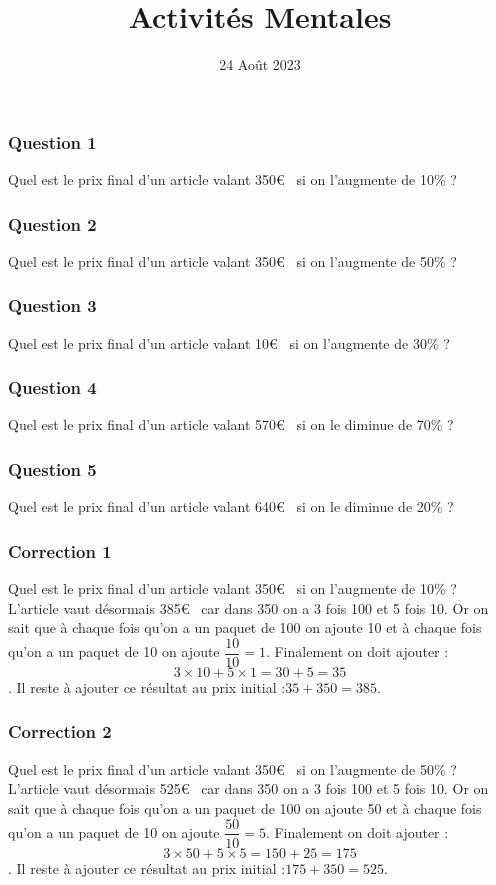 \documentclass[15pt, mathserif]{beamer}
\title{Activités Mentales}
\date{24 Août 2023}
\begin{document}
\begin{frame}
    \titlepage
\end{frame}

\begin{frame} 
	\frametitle{Question 1}
Quel est le prix final d'un article valant 350\euro ~ si on l'augmente de 10\% ?\end{frame}


\begin{frame} 
	\frametitle{Question 2}
Quel est le prix final d'un article valant 350\euro ~ si on l'augmente de 50\% ?\end{frame}


\begin{frame} 
	\frametitle{Question 3}
Quel est le prix final d'un article valant 10\euro ~ si on l'augmente de 30\% ?\end{frame}


\begin{frame} 
	\frametitle{Question 4}
Quel est le prix final d'un article valant 570\euro ~ si on le diminue de 70\% ?\end{frame}


\begin{frame} 
	\frametitle{Question 5}
Quel est le prix final d'un article valant 640\euro ~ si on le diminue de 20\% ?\end{frame}


\begin{frame}
\vspace{-10mm}
	\frametitle{Correction 1}
Quel est le prix final d'un article valant 350\euro ~ si on l'augmente de 10\% ? \\ L'article vaut désormais 385\euro ~ car dans 350 on a 3 fois 100 et 5 fois 10. Or on sait que à chaque fois qu'on a un paquet de 100 on ajoute 10 et à chaque fois qu'on a un paquet de 10 on ajoute $\dfrac{10}{10}=1$. Finalement on doit ajouter : $$3\times 10 + 5\times1 = 30+5=35$$. Il reste à ajouter ce résultat au prix initial :$35+350=385$.\end{frame}


\begin{frame}
\vspace{-10mm}
	\frametitle{Correction 2}
Quel est le prix final d'un article valant 350\euro ~ si on l'augmente de 50\% ? \\ L'article vaut désormais 525\euro ~ car dans 350 on a 3 fois 100 et 5 fois 10. Or on sait que à chaque fois qu'on a un paquet de 100 on ajoute 50 et à chaque fois qu'on a un paquet de 10 on ajoute $\dfrac{50}{10}=5$. Finalement on doit ajouter : $$3\times 50 + 5\times5 = 150+25=175$$. Il reste à ajouter ce résultat au prix initial :$175+350=525$.\end{frame}
\end{document}

